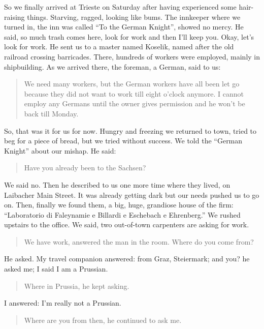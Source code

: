 So we finally arrived at Trieste on Saturday after having experienced some hair-raising things. Starving, ragged, looking like bums. The innkeeper where we turned in, the inn was called ``To the German Knight'', showed no mercy. He said, so much trash comes here, look for work and then I'll keep you. Okay, let's look for work. He sent us to a master named Koselik, named after the old railroad crossing barricades. There, hundreds of workers were employed, mainly in shipbuilding. As we arrived there, the foreman, a German, said to us:

\begin{quote}
We need many workers, but the German workers have all been let go because they did not want to work till eight o'clock anymore. I cannot employ any Germans until the owner gives permission and he won't be back till Monday.
\end{quote}

So, that was it for us for now. Hungry and freezing we returned to town, tried to beg for a piece of bread, but we tried without success. We told the ``German Knight'' about our mishap. He said:

\begin{quote}
Have you already been to the Sachsen?
\end{quote}

We said no. Then he described to us one more time where they lived, on Laibacher Main Street. It was already getting dark but our needs pushed us to go on. Then, finally we found them, a big, huge, grandiose house of the firm: ``Laboratorio di Faleynamie e Billardi e Eschebach e Ehrenberg.'' We rushed upstairs to the office. We said, two out-of-town carpenters are asking for work.

\begin{quote}
We have work, answered the man in the room. Where do you come from?
\end{quote}

He asked. My travel companion answered: from Graz, Steiermark; and you? he asked me; I said I am a Prussian.

\begin{quote}
Where in Prussia, he kept asking.
\end{quote}

I answered: I'm really not a Prussian.

\begin{quote}
Where are you from then, he continued to ask me.
\end{quote}

